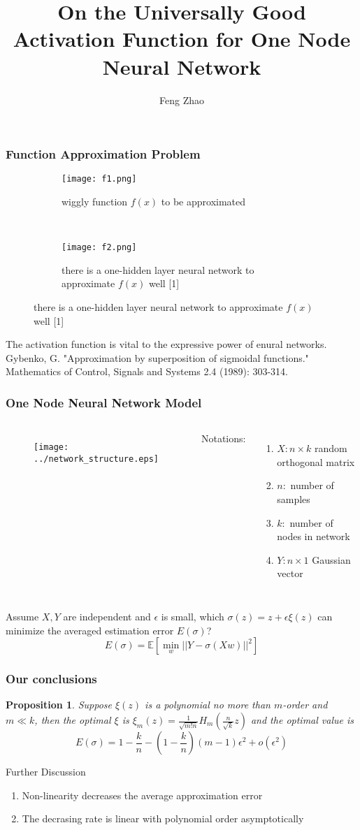 \documentclass{beamer}
\title{On the Universally Good Activation Function for One Node Neural Network}
\author{Feng Zhao}
\newtheorem{proposition}{Proposition}
\begin{document}
\begin{frame}
	\titlepage
\end{frame}
\begin{frame}
\frametitle{Function Approximation Problem}
\begin{figure}
	\centering
	\begin{subfigure}{0.4\textwidth}
		\texttt{[image: f1.png]}
		\caption{wiggly function $f(x)$ to be approximated}
	\end{subfigure}~~~~~
	\begin{subfigure}{0.4\textwidth}
		\texttt{[image: f2.png]}
		\caption{there is a one-hidden layer neural network to approximate $f(x)$ well [1]}
	\end{subfigure}
\end{figure}
The activation function is vital to the expressive power of enural networks.
\vskip 0.7cm
{\tiny Gybenko, G. "Approximation by superposition of sigmoidal functions." Mathematics of Control, Signals and Systems 2.4 (1989):
303-314.}
\end{frame}
\begin{frame}
\frametitle{One Node Neural Network Model}
\begin{columns}
\column{5cm}
\begin{figure}
\texttt{[image: ../network\_structure.eps]}
\end{figure}
\column{5cm}
Notations:
\begin{enumerate}
\item $X: n \times k$ random orthogonal matrix
\item $n :$ number of samples
\item $k: $ number of nodes in network 
\item $Y: n \times 1$ Gaussian vector
\end{enumerate}
\end{columns}
\vskip 0.5cm
Assume $X,Y$ are independent and $\epsilon$ is small, which $\sigma(z) = z + \epsilon \xi(z)$ can minimize the averaged estimation error $E(\sigma)$?
$$
E(\sigma)= \mathbb{E}[\min_{w} || Y - \sigma(X w) ||^2]
$$
\end{frame}
\begin{frame}
\frametitle{Our conclusions}
\begin{proposition}
Suppose $\xi(z)$ is a polynomial no more than $m$-order and $m\ll k$, then the optimal $\xi$ is $\xi_m(z) = \frac{1}{\sqrt{m! n}}H_m(\frac{n}{\sqrt{k}} z)$ and the optimal value is
$$
E(\sigma) = 1-\frac{k}{n}  - (1-\frac{k}{n})(m-1)  \epsilon^2 + o(\epsilon^2)
$$
\end{proposition}
\begin{block}{Further Discussion}
\begin{enumerate}
\item Non-linearity decreases the average approximation error
\item The decrasing rate is linear with polynomial order asymptotically
\end{enumerate}
\end{block}
\end{frame}
\end{document}
